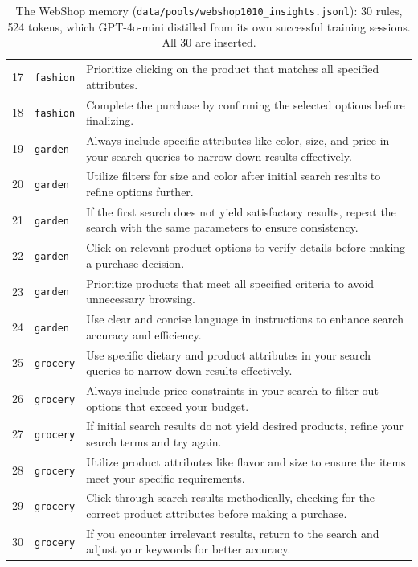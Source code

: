 \begin{table}[p]
\begin{tabular}{@{}rlL{0.80\textwidth}@{}}
17 & \texttt{fashion} & Prioritize clicking on the product that matches all specified attributes. \\
18 & \texttt{fashion} & Complete the purchase by confirming the selected options before finalizing. \\
19 & \texttt{garden} & Always include specific attributes like color, size, and price in your search queries to narrow down results effectively. \\
20 & \texttt{garden} & Utilize filters for size and color after initial search results to refine options further. \\
21 & \texttt{garden} & If the first search does not yield satisfactory results, repeat the search with the same parameters to ensure consistency. \\
22 & \texttt{garden} & Click on relevant product options to verify details before making a purchase decision. \\
23 & \texttt{garden} & Prioritize products that meet all specified criteria to avoid unnecessary browsing. \\
24 & \texttt{garden} & Use clear and concise language in instructions to enhance search accuracy and efficiency. \\
25 & \texttt{grocery} & Use specific dietary and product attributes in your search queries to narrow down results effectively. \\
26 & \texttt{grocery} & Always include price constraints in your search to filter out options that exceed your budget. \\
27 & \texttt{grocery} & If initial search results do not yield desired products, refine your search terms and try again. \\
28 & \texttt{grocery} & Utilize product attributes like flavor and size to ensure the items meet your specific requirements. \\
29 & \texttt{grocery} & Click through search results methodically, checking for the correct product attributes before making a purchase. \\
30 & \texttt{grocery} & If you encounter irrelevant results, return to the search and adjust your keywords for better accuracy. \\
\bottomrule
\end{tabular}
\caption{The WebShop memory (\texttt{data/pools/webshop1010\_insights.jsonl}): 30 rules, 524 tokens,
which GPT-4o-mini distilled from its own successful training sessions. All 30 are inserted.}
\label{tab:webpool}
\end{table}

